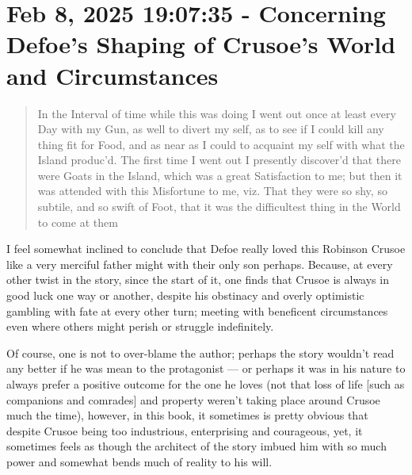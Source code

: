 \documentclass[a4paper]{article}
\begin{document}
\section{Feb 8, 2025 19:07:35 - Concerning Defoe's Shaping of Crusoe's World and Circumstances}
\label{SEC13}



\noindent
\begin{minipage}{1\textwidth}
\vspace{1em}
\begin{quotation}
{\ttfamily


In the Interval of time while this was doing I went out once at least every Day with my Gun, as well to divert my self, as to see if I could kill any thing fit for Food, and as near as I could to acquaint my self with what the Island produc’d. The first time I went out I presently discover’d that there were Goats in the Island, which was a great Satisfaction to me; but then it was attended with this Misfortune to me, viz. That they were so shy, so subtile, and so swift of Foot, that it was the difficultest thing in the World to come at them


}
\end{quotation}
\vspace{1em}
\end{minipage}


I feel somewhat inclined to conclude that Defoe really loved this Robinson Crusoe like a very merciful father might with their only son perhaps. Because, at every other twist in the story, since the start of it, one finds that Crusoe is always in good luck one way or another, despite his obstinacy and overly optimistic gambling with fate at every other turn; meeting with beneficent circumstances even where others might perish or struggle indefinitely. 

Of course, one is not to over-blame the author; perhaps the story wouldn't read any better if he was mean to the protagonist --- or perhaps it was in his nature to always prefer a positive outcome for the one he loves (not that loss of life [such as companions and comrades] and property weren't taking place around Crusoe much the time), however, in this book, it sometimes is pretty obvious that despite Crusoe being too industrious, enterprising and courageous, yet, it sometimes feels as though the architect of the story imbued him with so much power and somewhat bends much of reality to his will. 
\end{document}
